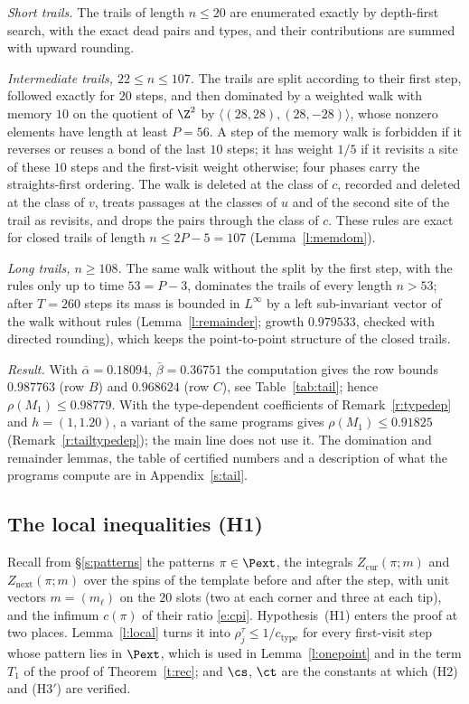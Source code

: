 \emph{Short trails.} The trails of length $n \le 20$ are enumerated exactly by depth-first search, with the exact dead pairs and types, and their contributions are summed with upward rounding.

\emph{Intermediate trails, $22 \le n \le 107$.} The trails are split according to their first step, followed exactly for $20$ steps, and then dominated by a weighted walk with memory $10$ on the quotient of $\Z^2$ by $\langle (28, 28), (28, -28) \rangle$, whose nonzero elements have length at least $P = 56$. A step of the memory walk is forbidden if it reverses or reuses a bond of the last $10$ steps; it has weight $1/5$ if it revisits a site of these $10$ steps and the first-visit weight otherwise; four phases carry the straights-first ordering. The walk is deleted at the class of $c$, recorded and deleted at the class of $v$, treats passages at the classes of $u$ and of the second site of the trail as revisits, and drops the pairs through the class of $c$. These rules are exact for closed trails of length $n \le 2P - 5 = 107$ (Lemma~\ref{l:memdom}).

\emph{Long trails, $n \ge 108$.} The same walk without the split by the first step, with the rules only up to time $53 = P - 3$, dominates the trails of every length $n > 53$; after $T = 260$ steps its mass is bounded in $L^\infty$ by a left sub-invariant vector of the walk without rules (Lemma~\ref{l:remainder}; growth $0.979533$, checked with directed rounding), which keeps the point-to-point structure of the closed trails.

\emph{Result.} With $\bar\alpha = 0.18094$, $\bar\beta = 0.36751$ the computation gives the row bounds $0.987763$ (row $B$) and $0.968624$ (row $C$), see Table~\ref{tab:tail}; hence $\rho(M_1) \le 0.98779$. With the type-dependent coefficients of Remark~\ref{r:typedep} and $h = (1, 1.20)$, a variant of the same programs gives $\rho(M_1) \le 0.91825$ (Remark~\ref{r:tailtypedep}); the main line does not use it. The domination and remainder lemmas, the table of certified numbers and a description of what the programs compute are in Appendix~\ref{s:tail}.

\subsection{The local inequalities (H1)}\label{s:H1}

Recall from \S\ref{s:patterns} the patterns $\pi \in \Pext$, the integrals $Z_{\mathrm{cur}}(\pi; m)$ and $Z_{\mathrm{next}}(\pi; m)$ over the spins of the template before and after the step, with unit vectors $m = (m_\ell)$ on the $20$ slots (two at each corner and three at each tip), and the infimum $c(\pi)$ of their ratio \eqref{e:cpi}. Hypothesis~(H1) enters the proof at two places. Lemma~\ref{l:local} turns it into $\rho^\tau_j \le 1/c_{\mathrm{type}}$ for every first-visit step whose pattern lies in $\Pext$, which is used in Lemma~\ref{l:onepoint} and in the term $T_1$ of the proof of Theorem~\ref{t:rec}; and $\cs$, $\ct$ are the constants at which (H2) and (H3$'$) are verified.

